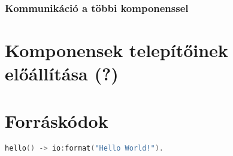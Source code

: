 \subsubsection{Kommunikáció a többi komponenssel}

\section{Komponensek telepítőinek előállítása (?)}














\section{Forráskódok}


\begin{lstlisting}[language={C++}]
hello() -> io:format("Hello World!").
\end{lstlisting}

